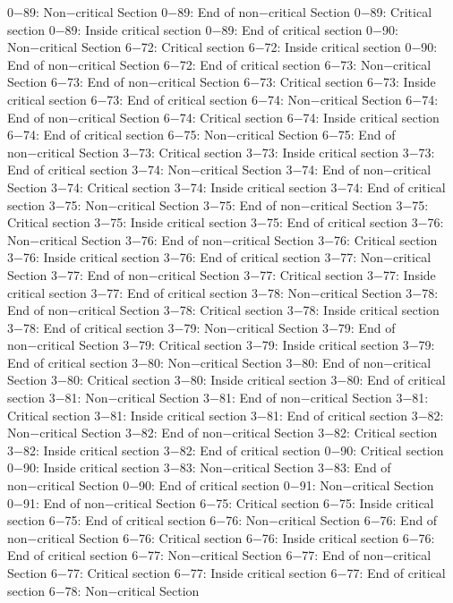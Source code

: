 0−89: Non−critical Section
0−89: End of non−critical Section
0−89: Critical section
0−89: Inside critical section
0−89: End of critical section
0−90: Non−critical Section
6−72: Critical section
6−72: Inside critical section
0−90: End of non−critical Section
6−72: End of critical section
6−73: Non−critical Section
6−73: End of non−critical Section
6−73: Critical section
6−73: Inside critical section
6−73: End of critical section
6−74: Non−critical Section
6−74: End of non−critical Section
6−74: Critical section
6−74: Inside critical section
6−74: End of critical section
6−75: Non−critical Section
6−75: End of non−critical Section
3−73: Critical section
3−73: Inside critical section
3−73: End of critical section
3−74: Non−critical Section
3−74: End of non−critical Section
3−74: Critical section
3−74: Inside critical section
3−74: End of critical section
3−75: Non−critical Section
3−75: End of non−critical Section
3−75: Critical section
3−75: Inside critical section
3−75: End of critical section
3−76: Non−critical Section
3−76: End of non−critical Section
3−76: Critical section
3−76: Inside critical section
3−76: End of critical section
3−77: Non−critical Section
3−77: End of non−critical Section
3−77: Critical section
3−77: Inside critical section
3−77: End of critical section
3−78: Non−critical Section
3−78: End of non−critical Section
3−78: Critical section
3−78: Inside critical section
3−78: End of critical section
3−79: Non−critical Section
3−79: End of non−critical Section
3−79: Critical section
3−79: Inside critical section
3−79: End of critical section
3−80: Non−critical Section
3−80: End of non−critical Section
3−80: Critical section
3−80: Inside critical section
3−80: End of critical section
3−81: Non−critical Section
3−81: End of non−critical Section
3−81: Critical section
3−81: Inside critical section
3−81: End of critical section
3−82: Non−critical Section
3−82: End of non−critical Section
3−82: Critical section
3−82: Inside critical section
3−82: End of critical section
0−90: Critical section
0−90: Inside critical section
3−83: Non−critical Section
3−83: End of non−critical Section
0−90: End of critical section
0−91: Non−critical Section
0−91: End of non−critical Section
6−75: Critical section
6−75: Inside critical section
6−75: End of critical section
6−76: Non−critical Section
6−76: End of non−critical Section
6−76: Critical section
6−76: Inside critical section
6−76: End of critical section
6−77: Non−critical Section
6−77: End of non−critical Section
6−77: Critical section
6−77: Inside critical section
6−77: End of critical section
6−78: Non−critical Section
